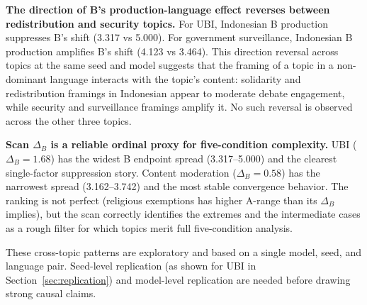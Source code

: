 \documentclass{article}
\begin{document}
\textbf{The direction of B's production-language effect reverses between redistribution and security topics.} For UBI, Indonesian B production suppresses B's shift (3.317 vs 5.000). For government surveillance, Indonesian B production amplifies B's shift (4.123 vs 3.464). This direction reversal across topics at the same seed and model suggests that the framing of a topic in a non-dominant language interacts with the topic's content: solidarity and redistribution framings in Indonesian appear to moderate debate engagement, while security and surveillance framings amplify it. No such reversal is observed across the other three topics.

\textbf{Scan $\Delta_B$ is a reliable ordinal proxy for five-condition complexity.} UBI ($\Delta_B=1.68$) has the widest B endpoint spread (3.317--5.000) and the clearest single-factor suppression story. Content moderation ($\Delta_B=0.58$) has the narrowest spread (3.162--3.742) and the most stable convergence behavior. The ranking is not perfect (religious exemptions has higher A-range than its $\Delta_B$ implies), but the scan correctly identifies the extremes and the intermediate cases as a rough filter for which topics merit full five-condition analysis.

These cross-topic patterns are exploratory and based on a single model, seed, and language pair. Seed-level replication (as shown for UBI in Section~\ref{sec:replication}) and model-level replication are needed before drawing strong causal claims.
\end{document}
